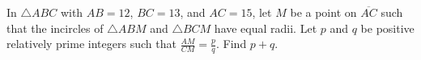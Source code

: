 In $ \triangle{ABC}$ with $ AB = 12$, $ BC = 13$, and $ AC = 15$, let $ M$ be a point on $ \overline{AC}$ such that the incircles of $ \triangle{ABM}$ and $ \triangle{BCM}$ have equal radii. Let $ p$ and $ q$ be positive relatively prime integers such that $ \tfrac{AM}{CM} = \tfrac{p}{q}$. Find $ p + q$.